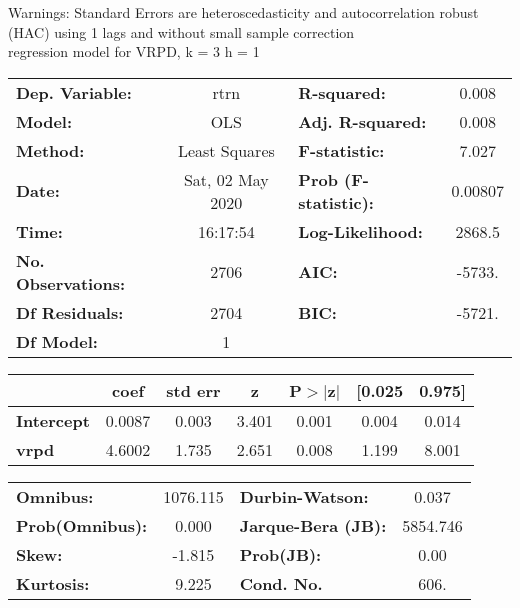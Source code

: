 Warnings: \newline
 [1] Standard Errors are heteroscedasticity and autocorrelation robust (HAC) using 1 lags and without small sample correction\\ 

regression model for VRPD, k = 3 h = 1\begin{center}
\begin{tabular}{lclc}
\toprule
\textbf{Dep. Variable:}    &       rtrn       & \textbf{  R-squared:         } &     0.008   \\
\textbf{Model:}            &       OLS        & \textbf{  Adj. R-squared:    } &     0.008   \\
\textbf{Method:}           &  Least Squares   & \textbf{  F-statistic:       } &     7.027   \\
\textbf{Date:}             & Sat, 02 May 2020 & \textbf{  Prob (F-statistic):} &  0.00807    \\
\textbf{Time:}             &     16:17:54     & \textbf{  Log-Likelihood:    } &    2868.5   \\
\textbf{No. Observations:} &        2706      & \textbf{  AIC:               } &    -5733.   \\
\textbf{Df Residuals:}     &        2704      & \textbf{  BIC:               } &    -5721.   \\
\textbf{Df Model:}         &           1      & \textbf{                     } &             \\
\bottomrule
\end{tabular}
\begin{tabular}{lcccccc}
                   & \textbf{coef} & \textbf{std err} & \textbf{z} & \textbf{P$> |$z$|$} & \textbf{[0.025} & \textbf{0.975]}  \\
\midrule
\textbf{Intercept} &       0.0087  &        0.003     &     3.401  &         0.001        &        0.004    &        0.014     \\
\textbf{vrpd}      &       4.6002  &        1.735     &     2.651  &         0.008        &        1.199    &        8.001     \\
\bottomrule
\end{tabular}
\begin{tabular}{lclc}
\textbf{Omnibus:}       & 1076.115 & \textbf{  Durbin-Watson:     } &    0.037  \\
\textbf{Prob(Omnibus):} &   0.000  & \textbf{  Jarque-Bera (JB):  } & 5854.746  \\
\textbf{Skew:}          &  -1.815  & \textbf{  Prob(JB):          } &     0.00  \\
\textbf{Kurtosis:}      &   9.225  & \textbf{  Cond. No.          } &     606.  \\
\bottomrule
\end{tabular}
\end{center}

